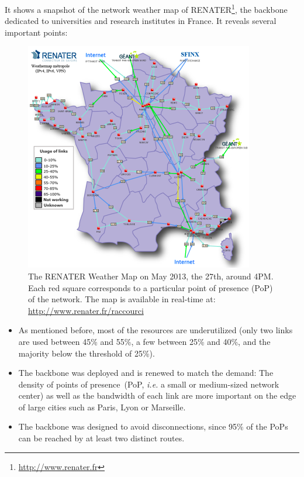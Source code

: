 \documentclass[11pt,a4paper,twoside]{article}
\newcommand{\ie}{\textit{i.e.}\xspace}
\begin{document}
It shows a snapshot of the network weather map of
RENATER\footnote{\href{http://www.renater.fr}{http://www.renater.fr}}, the backbone
dedicated to universities and research institutes in France. It reveals several
important points:
\begin{figure}[htbp]
\vspace*{-.3cm}
\includegraphics[width=10cm]{./FIGS/renater.png}
\centering\caption{The RENATER Weather Map on May 2013, the 27th, around 4PM.
Each red square corresponds to a particular point of presence (PoP) of the network. The map is available in real-time
at: \href{http://www.renater.fr/raccourci}{http://www.renater.fr/raccourci}}
\label{fig:renater}
\vspace*{-.3cm}
\end{figure}



\begin{itemize} 
\item As mentioned before, most of the resources are underutilized (only two links are used
  between 45\% and 55\%, a few between 25\% and 40\%, and the majority below the threshold
  of 25\%).
\item The backbone was deployed and is renewed to match the demand: The density of points
  of presence~(PoP, \ie a small or medium-sized network center) as well as the bandwidth
  of each link are more important on the edge of large cities such as Paris, Lyon or
  Marseille.
\item The backbone was designed to avoid disconnections, since 95\% of the PoPs can be
  reached by at least two distinct routes.
\end{itemize}
\end{document}
